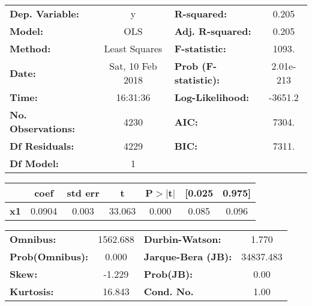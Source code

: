 \begin{center}
\begin{tabular}{lclc}
\toprule
\textbf{Dep. Variable:}    &        y         & \textbf{  R-squared:         } &     0.205   \\
\textbf{Model:}            &       OLS        & \textbf{  Adj. R-squared:    } &     0.205   \\
\textbf{Method:}           &  Least Squares   & \textbf{  F-statistic:       } &     1093.   \\
\textbf{Date:}             & Sat, 10 Feb 2018 & \textbf{  Prob (F-statistic):} & 2.01e-213   \\
\textbf{Time:}             &     16:31:36     & \textbf{  Log-Likelihood:    } &   -3651.2   \\
\textbf{No. Observations:} &        4230      & \textbf{  AIC:               } &     7304.   \\
\textbf{Df Residuals:}     &        4229      & \textbf{  BIC:               } &     7311.   \\
\textbf{Df Model:}         &           1      & \textbf{                     } &             \\
\bottomrule
\end{tabular}
\begin{tabular}{lcccccc}
            & \textbf{coef} & \textbf{std err} & \textbf{t} & \textbf{P$>$$|$t$|$} & \textbf{[0.025} & \textbf{0.975]}  \\
\midrule
\textbf{x1} &       0.0904  &        0.003     &    33.063  &         0.000        &        0.085    &        0.096     \\
\bottomrule
\end{tabular}
\begin{tabular}{lclc}
\textbf{Omnibus:}       & 1562.688 & \textbf{  Durbin-Watson:     } &     1.770  \\
\textbf{Prob(Omnibus):} &   0.000  & \textbf{  Jarque-Bera (JB):  } & 34837.483  \\
\textbf{Skew:}          &  -1.229  & \textbf{  Prob(JB):          } &      0.00  \\
\textbf{Kurtosis:}      &  16.843  & \textbf{  Cond. No.          } &      1.00  \\
\bottomrule
\end{tabular}
\end{center}